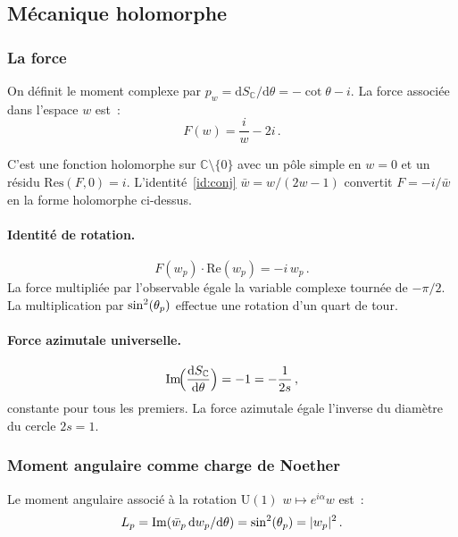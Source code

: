 \documentclass[12pt,a4paper]{article}
\begin{document}
\subsection{Mécanique holomorphe}
\label{sec:cx_force}

\subsubsection{La force}

On définit le moment complexe par
$p_w = \mathrm{d}S_{\mathbb{C}}/\mathrm{d}\theta = -\cot\theta - i$.
La force associée dans l'espace $w$ est~:
\begin{equation}
  F(w) = \frac{i}{w} - 2i\,.
  \label{eq:force}
\end{equation}

C'est une fonction holomorphe sur $\mathbb{C} \setminus \{0\}$ avec
un pôle simple en $w = 0$ et un résidu $\mathrm{Res}(F, 0) = i$.
L'identité~\ref{id:conj} $\bar{w} = w/(2w-1)$ convertit
$F = -i/\bar{w}$ en la forme holomorphe ci-dessus.

\paragraph{Identité de rotation.}
\begin{equation}
  F(w_p)\cdot\mathrm{Re}(w_p) = -i\,w_p\,.
  \label{eq:rotation}
\end{equation}
La force multipliée par l'observable égale la variable complexe
tournée de $-\pi/2$. La multiplication par $\sin^2(\theta_{p})$ effectue une
rotation d'un quart de tour.

\paragraph{Force azimutale universelle.}
\begin{equation}
  \mathrm{Im}\!\Bigl(\frac{\mathrm{d}S_{\mathbb{C}}}{\mathrm{d}\theta}\Bigr)
  = -1 = -\frac{1}{2s}\,,
  \label{eq:universal}
\end{equation}
constante pour tous les premiers. La force azimutale égale l'inverse
du diamètre du cercle $2s = 1$.

\subsubsection{Moment angulaire comme charge de Noether}

Le moment angulaire associé à la rotation $\mathrm{U}(1)$
$w \mapsto e^{i\alpha}w$ est~:
\begin{equation}
  L_p = \mathrm{Im}(\bar{w}_p\,\mathrm{d}w_p/\mathrm{d}\theta)
  = \sin^2(\theta_{p}) = |w_p|^2\,.
  \label{eq:angular_momentum}
\end{equation}
\end{document}

